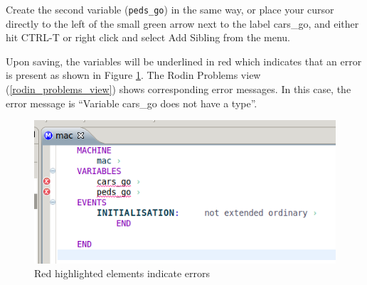 


Create the second variable (\texttt{peds\_go}) in the same way, or place your cursor directly to the left of the small green arrow next to the label \textsf{cars\_go}, and either hit \textsf{CTRL-T} or right click and select \textsf{Add Sibling} from the menu.


Upon saving, the variables will be underlined in red which indicates that an error is present as shown in Figure \ref{fig_tut_03_error}.  The \textsf{Rodin Problems} view (\ref{rodin_problems_view}) shows corresponding error messages. In this case, the error message is ``Variable cars\_go does not have a type''.

\begin{figure}[!ht]
\begin{center}
	\includegraphics[]{img/tutorial/tut_03_error_neweditor.png}
	\caption{Red highlighted elements indicate errors}
	\label{fig_tut_03_error}
\end{center}
\end{figure}

